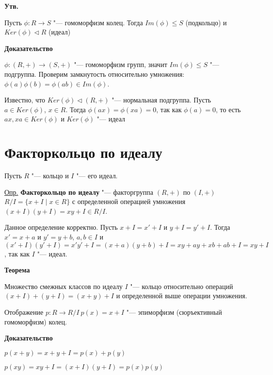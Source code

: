 \documentclass{article}
\begin{document}
\vspace{5pt}

\textbf{Утв.}

Пусть $\phi: R \rightarrow S$ "--- гомоморфизм колец. Тогда $Im(\phi) \leq S$ (подкольцо) и $Ker(\phi) \triangleleft R$ (идеал)

\vspace{5pt}

\textbf{Доказательство}

$\phi: (R, +) \rightarrow (S, +)$ "--- гомоморфизм групп, значит $Im(\phi) \leq S$ "--- подгруппа. Проверим замкнутость относительно умножения: $\phi(a)\phi(b) = \phi(ab) \in Im(\phi)$.

Известно, что $Ker(\phi) \triangleleft (R, +)$ "--- нормальная подгруппа. Пусть $a \in Ker(\phi)$, $x \in R$. Тогда $\phi(ax) = \phi(xa) = 0$, так как $\phi(a) = 0$, то есть $ax, xa \in Ker(\phi)$ и $Ker(\phi)$ "--- идеал

\section{Факторкольцо по идеалу}

Пусть $R$ "--- кольцо и $I$ "--- его идеал.

\underline{Опр.} \textbf{Факторкольцо по идеалу} "--- факторгруппа $(R, +)$ по $(I, +)$ $R / I = \{x + I \mid x \in R\}$ с определенной операцией умножения $(x + I)(y + I) = xy + I \in R / I$.

Данное определение корректно. Пусть $x + I = x' + I$ и $y + I = y' + I$. Тогда $x' = x + a$ и $y' = y + b$, $a, b \in I$ и $(x' + I)(y' + I) = x'y' + I = (x + a)(y + b) + I = xy + ay + xb + ab + I = xy + I$, так как $I$ "--- идеал.

\vspace{10pt}

\textbf{Теорема}

Множество смежных классов по идеалу $I$ "--- кольцо относительно операций $(x + I) + (y + I) = (x + y) + I$ и определенной выше операции умножения.

Отображение $p: R \rightarrow R / I \ p(x) = x + I$ "--- эпиморфизм (сюръективный гомоморфизм) колец.

\vspace{5pt}

\textbf{Доказательство}

$p(x + y) = x + y + I = p(x) + p(y)$

$p(xy) = xy + I = (x + I)(y + I) = p(x)p(y)$
\end{document}
